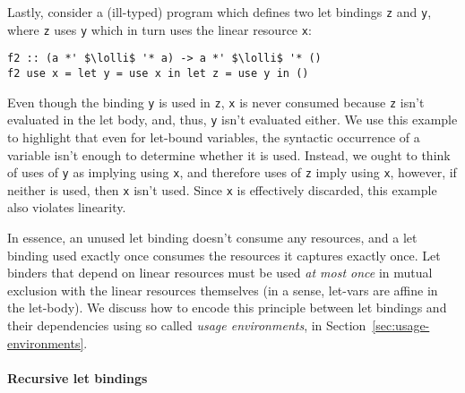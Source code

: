 \documentclass[acmsmall,review,anonymous,screen]{acmart}
\newcommand{\incode}[1]{\lstinline{#1}}
\newcommand{\parawith}[1]{\paragraph{\emph{#1}}}
\newcommand{\lolli}{\multimap}
\begin{document}
Lastly, consider a (ill-typed) program which defines two let bindings \incode{z} and \incode{y}, where
\incode{z} uses \incode{y} which in turn uses the linear resource \incode{x}:
%
\begin{noway}
\begin{lstlisting}
f2 :: (a *' $\lolli$ '* a) -> a *' $\lolli$ '* ()
f2 use x = let y = use x in let z = use y in ()
\end{lstlisting}
\end{noway}
%
Even though the binding \incode{y} is used in \incode{z}, \incode{x} is never
consumed because \incode{z} isn't evaluated in the let body, and, thus,
\incode{y} isn't evaluated either. We use this example to highlight that even
for let-bound variables, the syntactic occurrence of a variable isn't enough to
determine whether it is used. Instead, we ought to think of uses of \incode{y}
as implying using \incode{x}, and therefore uses of \incode{z} imply using
\incode{x}, however, if neither is used, then \incode{x} isn't used. Since
\incode{x} is effectively discarded, this example also violates linearity.

In essence, an unused let binding doesn't consume any resources, and a let
binding used exactly once consumes the resources it captures exactly once. Let
binders that depend on linear resources must be used \emph{at most once} in
mutual exclusion with the linear resources themselves (in a sense, let-vars are
affine in the let-body).
%
%
We discuss how to encode this principle between let bindings and their dependencies using so called \emph{usage
environments}, in Section~\ref{sec:usage-environments}.

\paragraph{Recursive let bindings\label{sec:semantic-linearity-examples:recursive-lets}}

%
\end{document}
